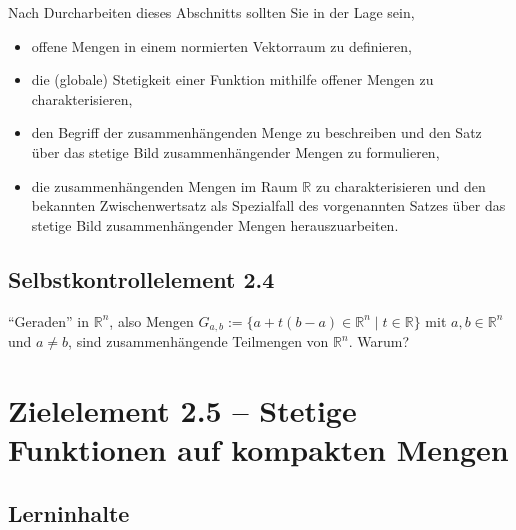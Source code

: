 \documentclass[a4paper,12pt]{article}
\begin{document}
Nach Durcharbeiten dieses Abschnitts sollten Sie in der Lage sein,
\begin{itemize}
  \item offene Mengen in einem normierten Vektorraum zu definieren,
  \item die (globale) Stetigkeit einer Funktion mithilfe offener Mengen zu
        charakterisieren,
  \item den Begriff der zusammenhängenden Menge zu beschreiben und den Satz über
        das stetige Bild zusammenhängender Mengen zu formulieren,
  \item die zusammenhängenden Mengen im Raum $\mathbb{R}$ zu charakterisieren und den
        bekannten Zwischenwertsatz als Spezialfall des vorgenannten Satzes über das
        stetige Bild zusammenhängender Mengen herauszuarbeiten.
\end{itemize}

\subsection*{Selbstkontrollelement 2.4}

"`Geraden"' in $\mathbb{R}^n$, also Mengen
$G_{a,b} := \{a + t(b-a) \in \mathbb{R}^n \mid t \in \mathbb{R}\}$ mit
$a, b \in \mathbb{R}^n$ und $a \neq b$, sind zusammenhängende Teilmengen von
$\mathbb{R}^n$. Warum?

\newpage

\section*{Zielelement 2.5 -- Stetige Funktionen auf kompakten Mengen}

\subsection*{Lerninhalte}
\end{document}
